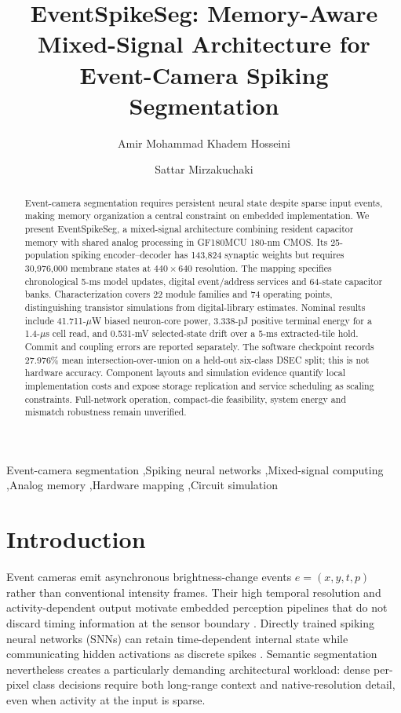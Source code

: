 \documentclass[preprint,12pt,number]{elsarticle}
\begin{document}
\begin{frontmatter}
\title{EventSpikeSeg: Memory-Aware Mixed-Signal Architecture for Event-Camera Spiking Segmentation}
\author[iust]{Amir Mohammad Khadem Hosseini}
\author[iust]{Sattar Mirzakuchaki}
\address[iust]{Iran University of Science and Technology, Hengam Street, Resalat Square, Tehran 16846-13114, Iran}
\begin{abstract}
Event-camera segmentation requires persistent neural state despite sparse input events, making memory organization a central constraint on embedded implementation. We present EventSpikeSeg, a mixed-signal architecture combining resident capacitor memory with shared analog processing in GF180MCU 180-nm CMOS. Its 25-population spiking encoder--decoder has 143,824 synaptic weights but requires 30,976,000 membrane states at $440\times640$ resolution. The mapping specifies chronological 5-ms model updates, digital event/address services and 64-state capacitor banks. Characterization covers 22 module families and 74 operating points, distinguishing transistor simulations from digital-library estimates. Nominal results include 41.711-$\mu$W biased neuron-core power, 3.338-pJ positive terminal energy for a 1.4-$\mu$s cell read, and 0.531-mV selected-state drift over a 5-ms extracted-tile hold. Commit and coupling errors are reported separately. The software checkpoint records 27.976\% mean intersection-over-union on a held-out six-class DSEC split; this is not hardware accuracy. Component layouts and simulation evidence quantify local implementation costs and expose storage replication and service scheduling as scaling constraints. Full-network operation, compact-die feasibility, system energy and mismatch robustness remain unverified.
\end{abstract}
\begin{keyword}
Event-camera segmentation \sep Spiking neural networks \sep Mixed-signal computing \sep Analog memory \sep Hardware mapping \sep Circuit simulation
\end{keyword}
\end{frontmatter}

\section{Introduction}
Event cameras emit asynchronous brightness-change events $e=(x,y,t,p)$ rather than conventional intensity frames. Their high temporal resolution and activity-dependent output motivate embedded perception pipelines that do not discard timing information at the sensor boundary \cite{gallego2022survey,binas2017ddd17,gehrig2021dsec}. Directly trained spiking neural networks (SNNs) can retain time-dependent internal state while communicating hidden activations as discrete spikes \cite{neftci2019surrogate,fang2021plif,fang2023spikingjelly}. Semantic segmentation nevertheless creates a particularly demanding architectural workload: dense per-pixel class decisions require both long-range context and native-resolution detail, even when activity at the input is sparse.
\end{document}
